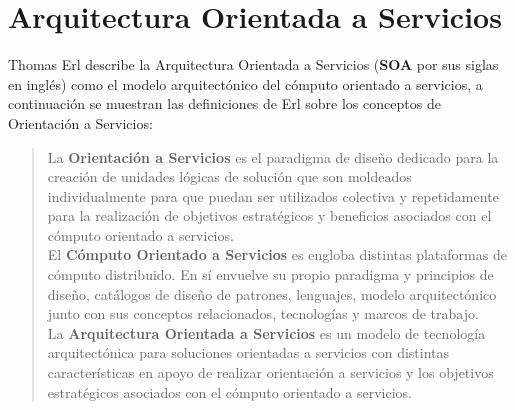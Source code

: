 \section{Arquitectura Orientada a Servicios}\label{sec-soa}
Thomas Erl describe la Arquitectura Orientada a Servicios (\textbf{SOA} por sus siglas en inglés) como el modelo arquitectónico del cómputo orientado a servicios\cite{SOAWithRest}, a continuación se muestran las definiciones de Erl\cite{SOAWithRest} sobre los conceptos de Orientación a Servicios:
\begin{quote}
La \textbf{Orientación a Servicios} es el paradigma de diseño dedicado para la creación de unidades lógicas de solución que son moldeados individualmente para que puedan ser utilizados colectiva y repetidamente para la realización de objetivos estratégicos y beneficios asociados con el cómputo orientado a servicios.\\
El \textbf{Cómputo Orientado a Servicios} es engloba distintas plataformas de cómputo distribuido. En sí envuelve su propio paradigma y principios de diseño, catálogos de diseño de patrones, lenguajes, modelo arquitectónico junto con sus conceptos relacionados, tecnologías y marcos de trabajo.\\
La \textbf{Arquitectura Orientada a Servicios} es un modelo de tecnología arquitectónica para soluciones orientadas a servicios con distintas características en apoyo de realizar orientación a servicios y los objetivos estratégicos asociados con el cómputo orientado a servicios.
\end{quote}


\iffalse
%
%
%
\fi